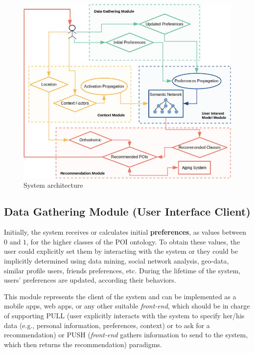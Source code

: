       


\begin{figure}[h]
\centering
\includegraphics[scale=0.35]{draws/arquitecture.jpg}
\vspace{-0.3cm}
\caption{System architecture}
\label{fig:arquitecture}
\vspace{-0.2cm}
\end{figure}

\vspace{-0.2cm}
\subsection{Data Gathering Module (User Interface Client)}
Initially, the system receives or calculates
initial \textbf{preferences}, as 
values between $0$ and $1$, for the higher classes of the POI ontology. To obtain these values, the user could explicitly set them by interacting with the system or they could be implicitly determined using data mining, social network analysis, geo-data, similar profile users, friends preferences, etc. During the lifetime of the system, users' preferences are updated, according their behaviors. 

This module represents the client of the system and can be implemented as a mobile apps, web apps, or any other suitable \textit{front-end}, which should be in charge of supporting PULL (user explicitly interacts with the system to specify her/his data (e.g., personal information, preferences, context) or to ask for a recommendation) or PUSH (\textit{front-end} gathers information to send to the system, which then returns the recommendation) paradigms.

